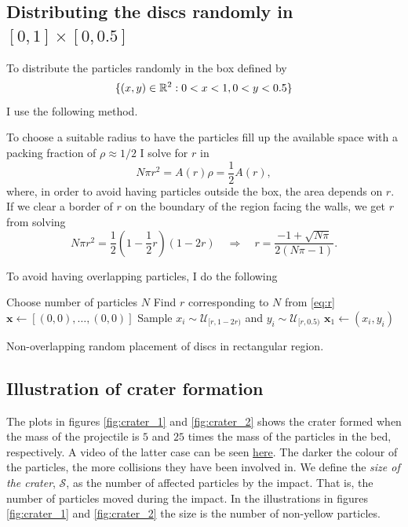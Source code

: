 \subsection{Distributing the discs randomly in $[0,1]\times[0,0.5]$}

To distribute the particles randomly in the box defined by 
$$
\{(x,y)\in \mathbb{R}^2 : 0 < x < 1, 0 < y < 0.5\}
$$ 
I use the following method. 

To choose a suitable radius to have the particles fill up the available space with a packing fraction of $\rho \approx 1/2$ I solve for $r$ in 
$$
	N \pi r^2 = A(r) \rho = \frac{1}{2} A(r),  
$$
where, in order to avoid having particles outside the box, the area depends on $r$. If we clear a border of $r$ on the boundary of the region facing the walls, we get $r$ from solving
\begin{equation}\label{eq:r}
	N \pi r^2 = \frac{1}{2} \left(1- \frac{1}{2}r\right) \left(1-2r\right) \quad \Rightarrow \quad r = \frac{-1 + \sqrt{N\pi}}{2(N\pi - 1)}.
\end{equation}

To avoid having overlapping particles, I do the following

\begin{algorithm}[H]
	Choose number of particles $N$\;
	Find $r$ corresponding to $N$ from \eqref{eq:r}\;
	$\mathbf{x} \gets [(0,0),\dots,(0,0)]$\;
	Sample $x_i \sim \mathcal{U}_{[r,1-2r)}$ and $y_i \sim \mathcal{U}_{[r,0.5)}$\;
	$\mathbf{x}_1 \gets (x_i,y_i)$\;
	\For{$i = 2\dots N$ }{
		Sample $x_i \sim \mathcal{U}_{[r,1-2r)}$ and $y_i \sim \mathcal{U}_{[r,0.5)}$\;
		$\mathbf{x}_i \gets (x_i,y_i)$\;
	\While{Particle $i$ does not overlap with particle $1,\dots,i-1$}{
		Sample $x_i \sim \mathcal{U}_{[r,1-2r)}$ and $y_i \sim \mathcal{U}_{[r,0.5)}$\;
		$\mathbf{x}_i \gets (x_i,y_i)$\;
	}}
	\caption{Non-overlapping random placement of discs in rectangular region.}
\end{algorithm}  

\subsection{Illustration of crater formation}

The plots in figures \ref{fig:crater_1} and \ref{fig:crater_2} shows the crater formed when the mass of the projectile is $5$ and $25$ times the mass of the particles in the bed, respectively. A video of the latter case can be seen \href{https://folk.ntnu.no/sondrdl/eventdrivengas/crater.mp4}{here}. The darker the colour of the particles, the more collisions they have been involved in. We define the \textit{size of the crater}, $\mathcal{S}$, as the number of affected particles by the impact. That is, the number of particles moved during the impact. In the illustrations in figures \ref{fig:crater_1} and \ref{fig:crater_2} the size is the number of non-yellow particles. 

